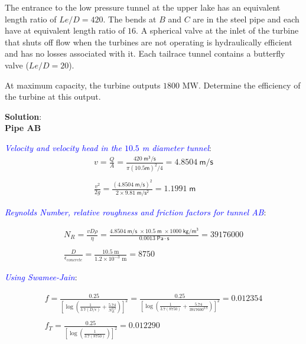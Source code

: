 \documentclass[10pt]{amsart}
\begin{document}
\par\medskip
The entrance to the low pressure tunnel at the upper lake has an equivalent length ratio of $Le/D=420$. The bends at
$B$ and $C$ are in the steel pipe and each have at equivalent length ratio of $16$. A spherical valve at the
inlet of the turbine that shuts off flow when the turbines are not operating is hydraulically efficient and has no
losses associated with it. Each tailrace tunnel contains a butterfly valve ($Le/D=20$).
\par\medskip
At maximum capacity, the turbine outputs $1800 \text{ MW}$. Determine the efficiency of the turbine at this output.

\textbf{Solution}:\\

%

\textbf{Pipe AB}

\textcolor{blue}{\em Velocity and velocity head in the $10.5$ m diameter tunnel}:\\

\begin{gather*}
	v = \frac{Q}{A} = \frac{420\mathsf{\;m^3/s}}{\pi(10.5\mathsf{ m})^2/4}=4.8504\mathsf{\ m/s} \\\\
	\frac{v^2}{2g} = \frac{(4.8504\mathsf{\;m/s})^2}{2\times9.81\mathsf{\;m/s^2}} = 1.1991\mathsf{\; m}
\end{gather*}

\textcolor{blue}{\em Reynolds Number, relative roughness and friction factors for tunnel AB}:

\begin{gather*}
	N_R = \frac{vD\rho}{\eta} =
	\frac{4.8504\mathsf{\;m/s\;}\times10.5\mathsf{\;m\;}\times1000\mathsf{\;kg/m^3}}{0.0013\;\mathsf{Pa\cdot s}} =
	39176000\\\\
	\frac{D}{\epsilon_{concrete}} = \frac{10.5\;\text{m}}{1.2\times10^{-3}\text{ m}} = 8750
\end{gather*}

\textcolor{blue}{\em Using Swamee-Jain}:

\begin{gather*}
	f = \frac{0.25}{\left[\log\left(\frac{1}{3.7(D/\epsilon)}+\frac{5.74}{N_R^{0.9}}\right)\right]^2} =
	\frac{0.25}{\left[\log\left(\frac{1}{3.7(8750)}+\frac{5.74}{3917600^{0.9}}\right)\right]^2}=0.012354
	\\\\
	f_T = \frac{0.25}{\left[\log\left(\frac{1}{3.7(8750)}\right)\right]^2} = 0.012290
\end{gather*}
\end{document}
